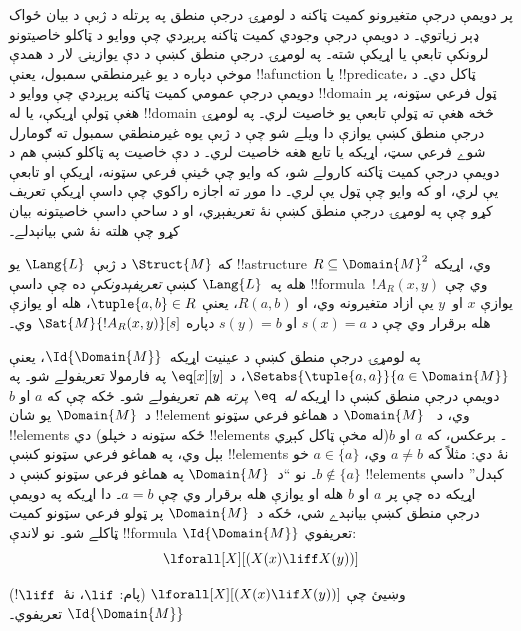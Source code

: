 \documentclass[../../../include/open-logic-section]{subfiles}
\begin{document}

\begin{explain}
پر دويمې درجې متغيرونو کميت ټاکنه د لومړۍ درجې منطق په پرتله د ژبې د
بيان ځواک ډېر زياتوي۔ د دويمې درجې وجودي کميت ټاکنه پرېږدي چې ووايو
د ټاکلو خاصيتونو لرونکې تابعې يا اړيکې شته۔ په لومړۍ درجې منطق کښې
د دې يوازينۍ لار د همدې موخې دپاره د يو غيرمنطقي سمبول، يعنې
!!a{function} يا !!{predicate}، ټاکل دي۔ د دويمې درجې عمومي کميت
ټاکنه پرېږدي چې ووايو د !!{domain} ټول فرعي سټونه، پر هغې ټولې
اړيکې، يا له !!{domain} څخه هغې ته ټولې تابعې يو خاصيت لري۔ په
لومړۍ درجې منطق کښې يوازې دا ويلے شو چې د ژبې يوه غيرمنطقي سمبول ته
ګومارل شوے فرعي سټ، اړيکه يا تابع هغه خاصيت لري۔ د دې خاصيت په
ټاکلو کښې هم د دويمې درجې کميت ټاکنه کارولے شو، که وايو چې ځينې
فرعي سټونه، اړيکې او تابعې يې لري، او که وايو چې ټول يې لري۔ دا
موږ ته اجازه راکوي چې داسې اړيکې تعريف کړو چې په لومړۍ درجې منطق
کښې نۀ تعريفېږي، او د ساحې داسې خاصيتونه بيان کړو چې هلته نۀ شي
بيانېدلے۔
\end{explain}

\begin{defn}
که $\Struct{M}$ د ژبې~$\Lang{L}$ يو !!a{structure} وي، اړيکه
$R \subseteq \Domain{M}^2$ هله په~$\Lang{L}$ کښې \emph{تعريفېدونکې}
ده چې داسې !!{formula}~$!A_R(x, y)$ وي چې يوازې $x$ او~$y$ يې ازاد
متغيرونه وي، او $R(a, b)$، يعنې $\tuple{a,b} \in R$، هله او يوازې
هله برقرار وي چې د $s(x) = a$ او $s(y) = b$ دپاره
$\Sat{M}{!A_R(x, y)}[s]$ وي۔
\end{defn}

\begin{ex}
په لومړۍ درجې منطق کښې د عينيت اړيکه~$\Id{\Domain{M}}$، يعنې
$\Setabs{\tuple{a,a}}{a \in
  \Domain{M}}$، د $\eq[x][y]$ په فارمولا تعريفولے شو۔ په دويمې
درجې منطق کښې دا اړيکه \emph{له~$\eq$ پرته} هم تعريفولے شو۔ ځکه
چې که $a$ او $b$ د~$\Domain{M}$ يو شان !!{element} وي، د
~$\Domain{M}$ د هماغو فرعي سټونو !!{element}s دي (ځکه سټونه د خپلو
!!{element}s له مخې ټاکل کېږي)۔ برعکس، که $a$ او $b$ بېل وي، په
هماغو فرعي سټونو کښې !!{element}s نۀ دي: مثلاً که $a \neq b$ وي، $a \in
\{a\}$ خو $b \notin \{a\}$۔ نو ``د~$\Domain{M}$ په هماغو
فرعي سټونو کښې د !!{element}s کېدل'' داسې اړيکه ده چې پر $a$ او
$b$ هله او يوازې هله برقرار وي چې $a = b$۔ دا اړيکه په دويمې درجې
منطق کښې بيانېدے شي، ځکه د~$\Domain{M}$ پر ټولو فرعي سټونو کميت
ټاکلے شو۔ نو لاندې !!{formula} $\Id{\Domain{M}}$ تعريفوي:
\[
\lforall[X][(X(x) \liff X(y))]
\]
\end{ex}

\begin{prob}
وښيئ چې $\lforall[X][(X(x) \lif X(y))]$ (پام: $\lif$،
نۀ~$\liff$!) $\Id{\Domain{M}}$ تعريفوي۔
\end{prob}
\end{document}
